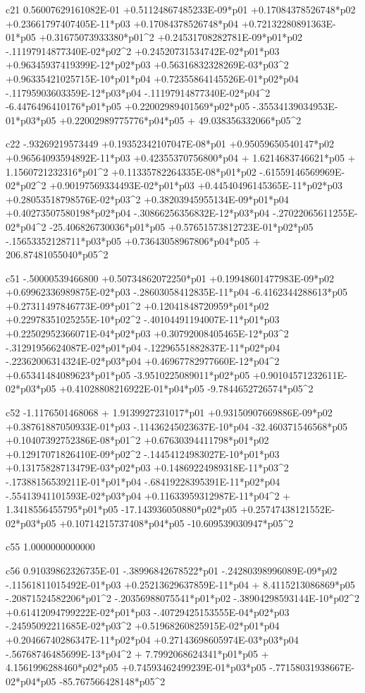  c21
  0.56007629161082E-01 +0.51124867485233E-09*p01 +0.17084378526748*p02 +0.23661797407405E-11*p03 +0.17084378526748*p04 +0.72132280891363E-01*p05 +0.31675073933380*p01^2 +0.24531708282781E-09*p01*p02  -.11197914877340E-02*p02^2 +0.24520731534742E-02*p01*p03 +0.96345937419399E-12*p02*p03 +0.56316832328269E-03*p03^2 +0.96335421025715E-10*p01*p04 +0.72355864145526E-01*p02*p04  -.11795903603359E-12*p03*p04  -.11197914877340E-02*p04^2  -6.4476496410176*p01*p05 +0.22002989401569*p02*p05  -.35534139034953E-01*p03*p05 +0.22002989775776*p04*p05 + 49.038356332066*p05^2 
  
 c22
  -.93269219573449 +0.19352342107047E-08*p01 +0.95059650540147*p02 +0.96564093594892E-11*p03 +0.42355370756800*p04 + 1.6214683746621*p05 + 1.1560721232316*p01^2 +0.11335782264335E-08*p01*p02  -.61559146569969E-02*p02^2 +0.90197569334493E-02*p01*p03 +0.44540496145365E-11*p02*p03 +0.28053518798576E-02*p03^2 +0.38203945955134E-09*p01*p04 +0.40273507580198*p02*p04  -.30866256356832E-12*p03*p04  -.27022065611255E-02*p04^2  -25.406826730036*p01*p05 +0.57651573812723E-01*p02*p05  -.15653352128711*p03*p05 +0.73643058967806*p04*p05 + 206.87481055040*p05^2 
  
 c51
  -.50000539466800 +0.50734862072250*p01 +0.19948601477983E-09*p02 +0.69962336989875E-02*p03  -.28603058412835E-11*p04  -6.4162344288613*p05 +0.27311497846773E-09*p01^2 +0.12041848720959*p01*p02 +0.22978351025255E-10*p02^2  -.40104491194007E-11*p01*p03 +0.22502952366071E-04*p02*p03 +0.30792008405465E-12*p03^2  -.31291956624087E-02*p01*p04  -.12296551882837E-11*p02*p04  -.22362006314324E-02*p03*p04 +0.46967782977660E-12*p04^2 +0.65341484089623*p01*p05  -3.9510225089011*p02*p05 +0.90104571232611E-02*p03*p05 +0.41028808216922E-01*p04*p05  -9.7844652726574*p05^2 
  
 c52
  -1.1176501468068 + 1.9139927231017*p01 +0.93150907669886E-09*p02 +0.38761887050933E-01*p03  -.11436245023637E-10*p04  -32.460371546568*p05 +0.10407392752386E-08*p01^2 +0.67630394411798*p01*p02 +0.12917071826410E-09*p02^2  -.14454124983027E-10*p01*p03 +0.13175828713479E-03*p02*p03 +0.14869224989318E-11*p03^2  -.17388156539211E-01*p01*p04  -.68419228395391E-11*p02*p04  -.55413941101593E-02*p03*p04 +0.11633959312987E-11*p04^2 + 1.3418556455795*p01*p05  -17.143936050880*p02*p05 +0.25747438121552E-02*p03*p05 +0.10714215737408*p04*p05  -10.609539030947*p05^2 
  
 c55
   1.0000000000000 
  
 c56
  0.91039862326735E-01  -.38996842678522*p01  -.24280398996089E-09*p02  -.11561811015492E-01*p03 +0.25213629637859E-11*p04 + 8.4115213086869*p05  -.20871524582206*p01^2  -.20356988075541*p01*p02  -.38904298593144E-10*p02^2 +0.61412094799222E-02*p01*p03  -.40729425153555E-04*p02*p03  -.24595092211685E-02*p03^2 +0.51968260825915E-02*p01*p04 +0.20466740286347E-11*p02*p04 +0.27143698605974E-03*p03*p04  -.56768746485699E-13*p04^2 + 7.7992068624341*p01*p05 + 4.1561996288460*p02*p05 +0.74593462499239E-01*p03*p05  -.77158031938667E-02*p04*p05  -85.767566428148*p05^2 
  
